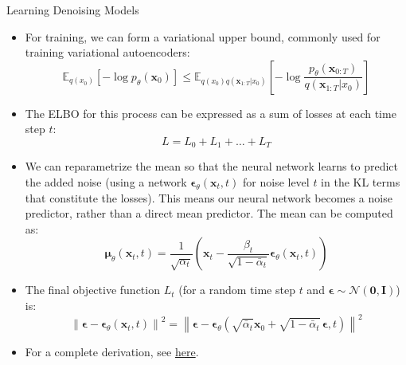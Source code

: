 \begin{frame}[allowframebreaks]{Learning Denoising Models}
\begin{itemize}
    \item For training, we can form a variational upper bound, commonly used for training variational autoencoders:
    $$
    \mathbb{E}_{q(x_0)} \left[-\log p_\theta(\mathbf{x}_0)\right] \leq \mathbb{E}_{q(x_0)q(\mathbf{x}_{1:T}|x_0)} \left[ -\log\frac{p_\theta(\mathbf{x}_{0:T})}{q(\mathbf{x}_{1:T}|x_0)} \right]
    $$
    \item The ELBO for this process can be expressed as a sum of losses at each time step $t$:
    $$
    L = L_0 + L_1 + \dots + L_T
    $$
\end{itemize}

\framebreak

\begin{itemize}
    \item We can reparametrize the mean so that the neural network learns to predict the added noise (using a network $\mathbf{\epsilon}_\theta(\mathbf{x}_t, t)$ for noise level $t$ in the KL terms that constitute the losses). This means our neural network becomes a noise predictor, rather than a direct mean predictor. The mean can be computed as:
    $$
    \mathbf{\mu}_\theta(\mathbf{x}_t, t) = \frac{1}{\sqrt{\alpha_t}} \left(  \mathbf{x}_t - \frac{\beta_t}{\sqrt{1- \bar{\alpha}_t}} \mathbf{\epsilon}_\theta(\mathbf{x}_t, t) \right)
    $$
    \item The final objective function $L_t$ (for a random time step $t$ and $\mathbf{\epsilon} \sim \mathcal{N}(\mathbf{0}, \mathbf{I})$) is:
    $$
    \left\| \mathbf{\epsilon} - \mathbf{\epsilon}_\theta(\mathbf{x}_t, t) \right\|^2 = \left\| \mathbf{\epsilon} - \mathbf{\epsilon}_\theta\left( \sqrt{\bar{\alpha}_t} \mathbf{x}_0 + \sqrt{1- \bar{\alpha}_t} \, \mathbf{\epsilon}, t \right) \right\|^2
    $$
    \item For a complete derivation, see \href{https://lilianweng.github.io/posts/2021-07-11-diffusion-models/}{here}.
\end{itemize}
\end{frame}